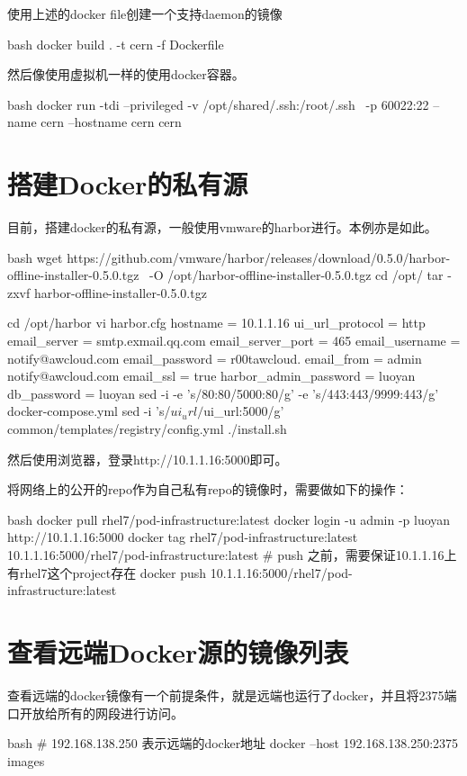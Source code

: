 使用上述的docker file创建一个支持daemon的镜像
\begin{code-block}{bash}
docker build . -t cern -f Dockerfile
\end{code-block}

然后像使用虚拟机一样的使用docker容器。
\begin{code-block}{bash}
docker run -tdi --privileged -v /opt/shared/.ssh:/root/.ssh \
    -p 60022:22 --name cern --hostname cern cern
\end{code-block}

\section{搭建Docker的私有源}
目前，搭建docker的私有源，一般使用vmware的harbor进行。本例亦是如此。
\begin{code-block}{bash}
wget https://github.com/vmware/harbor/releases/download/0.5.0/harbor-offline-installer-0.5.0.tgz \
    -O /opt/harbor-offline-installer-0.5.0.tgz
cd /opt/
tar -zxvf harbor-offline-installer-0.5.0.tgz

cd /opt/harbor
vi harbor.cfg
hostname = 10.1.1.16
ui_url_protocol = http
email_server = smtp.exmail.qq.com
email_server_port = 465
email_username = notify@awcloud.com
email_password = r00tawcloud.
email_from = admin notify@awcloud.com
email_ssl = true
harbor_admin_password = luoyan
db_password = luoyan
sed -i -e 's/80:80/5000:80/g' -e 's/443:443/9999:443/g' docker-compose.yml
sed -i 's/$ui_url/$ui_url:5000/g' common/templates/registry/config.yml
./install.sh
\end{code-block}

然后使用浏览器，登录http://10.1.1.16:5000即可。

将网络上的公开的repo作为自己私有repo的镜像时，需要做如下的操作：
\begin{code-block}{bash}
docker pull rhel7/pod-infrastructure:latest
docker login -u admin -p luoyan http://10.1.1.16:5000
docker tag rhel7/pod-infrastructure:latest 10.1.1.16:5000/rhel7/pod-infrastructure:latest
# push 之前，需要保证10.1.1.16上有rhel7这个project存在
docker push 10.1.1.16:5000/rhel7/pod-infrastructure:latest
\end{code-block}

\section{查看远端Docker源的镜像列表}
查看远端的docker镜像有一个前提条件，就是远端也运行了docker，并且将2375端口开放给所有的网段进行访问。
\begin{code-block}{bash}
# 192.168.138.250 表示远端的docker地址
docker --host 192.168.138.250:2375 images
\end{code-block}

